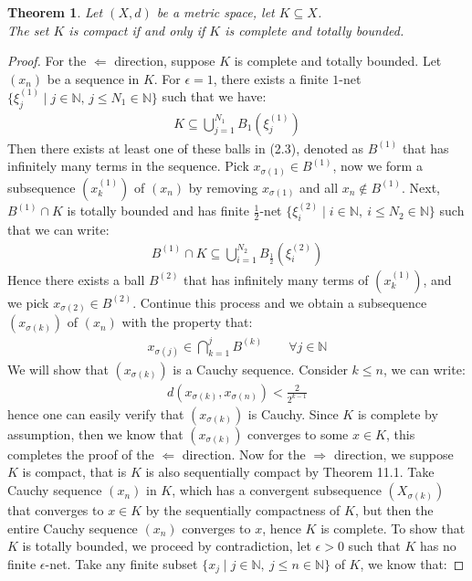 \documentclass[11pt]{book}
\theoremstyle{break}
\theoremstyle{break}
\newtheorem{thm}{Theorem}[section]
\newcommand{\N}{\mathbb{N}}
\begin{document}
\newpage
\begin{thm}
Let $(X,d)$ be a metric space, let $K \subseteq X$. \\
The set $K$ is compact if and only if $K$ is complete and totally bounded.
\end{thm}
\begin{proof}
For the $\Leftarrow$ direction, suppose $K$ is complete and totally bounded. Let $(x_n)$ be a sequence in $K$. For $\epsilon = 1$, there exists a finite $1$-net $\{\xi_{j}^{(1)}\mid j \in \N,\, j \leq N_1 \in \N\}$ such that we have:
\begin{align}
K \subseteq \bigcup_{j=1}^{N_1} B_{1}(\xi_{j}^{(1)})
\end{align}
Then there exists at least one of these balls in (2.3), denoted as $B^{(1)}$ that has infinitely many terms in the sequence. Pick $x_{\sigma(1)} \in B^{(1)}$, now we form a subsequence $(x_k^{(1)})$ of $(x_n)$ by removing $x_{\sigma(1)}$ and all $x_n \notin B^{(1)}$. Next, $B^{(1)}\cap K$ is totally bounded and has finite $\frac{1}{2}$-net $\{ \xi^{(2)}_i \mid i \in \N,\ i\leq N_2 \in \N\}$ such that we can write:
\begin{align*}
B^{(1)}\cap K \subseteq \bigcup_{i=1}^{N_2} B_{\frac{1}{2}}( \xi_i^{(2)})
\end{align*}
Hence there exists a ball $B^{(2)}$ that has infinitely many terms of $(x_k^{(1)})$, and we pick $x_{\sigma(2)} \in B^{(2)}$. Continue this process and we obtain a subsequence $(x_{\sigma(k)})$ of $(x_n)$ with the property that:
\begin{align*}
x_{\sigma(j)} \in \bigcap_{k=1}^j B^{(k)}\qquad \forall j\in \N
\end{align*}
We will show that $(x_{\sigma(k)})$ is a Cauchy sequence. Consider $k \leq n$, we can write:
\begin{align*}
d(x_{\sigma(k)}, x_{\sigma(n)}) < \frac{2}{2^{k-1}}
\end{align*}
hence one can easily verify that $(x_{\sigma(k)})$ is Cauchy. Since $K$ is complete by assumption, then we know that $(x_{\sigma(k)})$ converges to some $x \in K$, this completes the proof of the $\Leftarrow$ direction. Now for the $\Rightarrow$ direction, we suppose $K$ is compact, that is $K$ is also sequentially compact by Theorem 11.1. Take Cauchy sequence $(x_n)$ in $K$, which has a convergent subsequence $(X_{\sigma(k)})$ that converges to $x \in K$ by the sequentially compactness of $K$, but then the entire Cauchy sequence $(x_n)$ converges to $x$, hence $K$ is complete. To show that $K$ is totally bounded, we proceed by contradiction, let $\epsilon>0$ such that $K$ has no finite $\epsilon$-net. Take any finite subset $\{x_j \mid j\in \N,\ j \leq n \in \N\}$ of $K$, we know that:

\end{proof}
\end{document}
